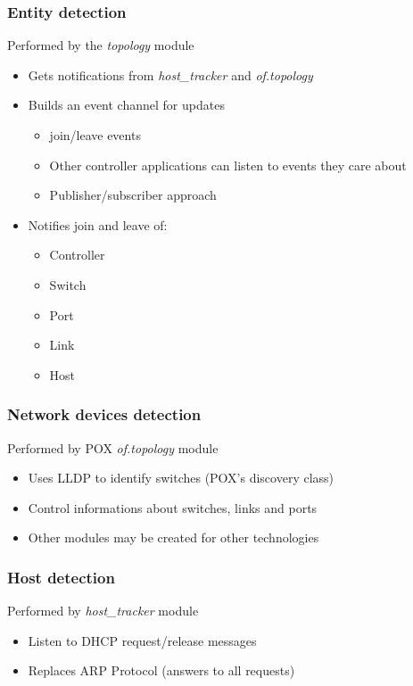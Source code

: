 %
%
\begin{frame}\frametitle{Entity detection}

    Performed by the \emph{topology} module
    \begin{itemize}
        \setlength{\itemsep}{10pt}
        \item Gets notifications from \emph{host\_tracker} and
            \emph{of.topology}
        \item Builds an event channel for updates
            \begin{itemize}
                \item join/leave events
                \item Other controller applications can listen to events they
                    care about
                \item Publisher/subscriber approach
            \end{itemize}
        \item Notifies join and leave of:
            \begin{itemize}
                \item Controller
                \item Switch
                \item Port
                \item Link
                \item Host
            \end{itemize}
    \end{itemize}
\end{frame}

%
%
\begin{frame}\frametitle{Network devices detection}
    
    Performed by POX \emph{of.topology} module
    \begin{itemize}
        \item Uses LLDP to identify switches (POX's discovery class)
        \item Control informations about switches, links and ports
        \item Other modules may be created for other technologies
    \end{itemize}
\end{frame}


%
%
\begin{frame}\frametitle{Host detection}

    Performed by \emph{host\_tracker} module
    \begin{itemize}
        \item Listen to DHCP request/release messages
        \item Replaces ARP Protocol (answers to all requests)
    \end{itemize}
\end{frame}
